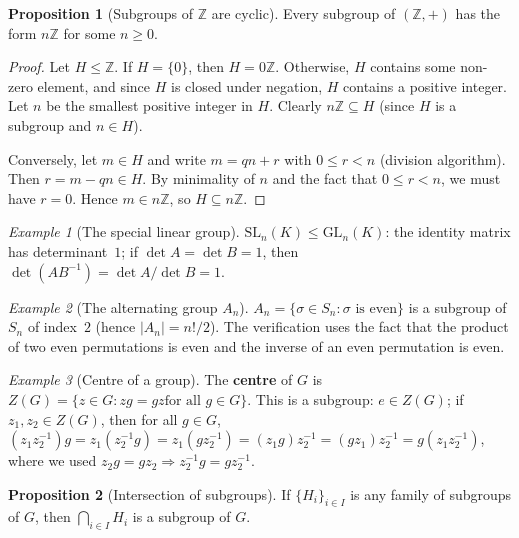 \documentclass[12pt,a4paper,openany]{book}
\theoremstyle{definition}
\newtheorem{proposition}{Proposition}[chapter]
\theoremstyle{remark}
\newtheorem{example}{Example}[chapter]
\newcommand{\Z}{\mathbb{Z}}
\begin{document}
\begin{proposition}[Subgroups of $\Z$ are cyclic]
\label{prop:subgroups-Z}
Every subgroup of $(\Z,+)$ has the form $n\Z$ for some $n\ge 0$.
\end{proposition}

\begin{proof}
Let $H\le\Z$.  If $H=\{0\}$, then $H=0\Z$.  Otherwise, $H$ contains some
non-zero element, and since $H$ is closed under negation, $H$ contains a
positive integer.  Let $n$ be the smallest positive integer in $H$.  Clearly
$n\Z\subseteq H$ (since $H$ is a subgroup and $n\in H$).

Conversely, let $m\in H$ and write $m=qn+r$ with $0\le r<n$ (division
algorithm).  Then $r=m-qn\in H$.  By minimality of $n$ and the fact that
$0\le r<n$, we must have $r=0$.  Hence $m\in n\Z$, so $H\subseteq n\Z$.
\end{proof}

\begin{example}[The special linear group]
\label{ex:SLn-subgroup}
$\text{SL}_n(K)\le\text{GL}_n(K)$: the identity matrix has determinant~$1$;
if $\det A=\det B=1$, then $\det(AB^{-1})=\det A/\det B=1$.
\end{example}

\begin{example}[The alternating group $A_n$]
\label{ex:An-subgroup}
$A_n = \{\sigma\in S_n : \sigma\text{ is even}\}$ is a subgroup of $S_n$
of index~$2$ (hence $|A_n|=n!/2$).  The verification uses the fact that the
product of two even permutations is even and the inverse of an even
permutation is even.
\end{example}

\begin{example}[Centre of a group]
\label{ex:centre-subgroup}
The \textbf{centre} of $G$ is $Z(G)=\{z\in G: zg=gz\text{
for all }g\in G\}$.  This is a subgroup: $e\in Z(G)$; if $z_1,z_2\in Z(G)$,
then for all $g\in G$,
$(z_1z_2^{-1})g=z_1(z_2^{-1}g)=z_1(gz_2^{-1})=(z_1g)z_2^{-1}=
(gz_1)z_2^{-1}=g(z_1z_2^{-1})$, where we used $z_2g=gz_2\Rightarrow
z_2^{-1}g=gz_2^{-1}$.
\end{example}

\begin{proposition}[Intersection of subgroups]
\label{prop:intersection-subgroups}
If $\{H_i\}_{i\in I}$ is any family of subgroups of $G$, then
$\bigcap_{i\in I}H_i$ is a subgroup of $G$.
\end{proposition}
\end{document}
